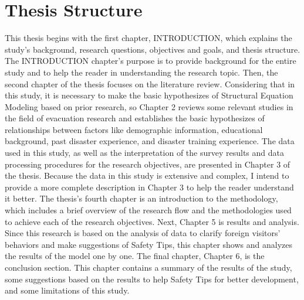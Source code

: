 \section{Thesis Structure}
This thesis begins with the first chapter, INTRODUCTION, which explains the study's background, research questions, objectives and goals, and thesis structure. The INTRODUCTION chapter's purpose is to provide background for the entire study and to help the reader in understanding the research topic. Then, the second chapter of the thesis focuses on the literature review. Considering that in this study, it is necessary to make the basic hypothesizes of Structural Equation Modeling based on prior research, so Chapter 2 reviews some relevant studies in the field of evacuation research and establishes the basic hypothesizes of relationships between factors like demographic information, educational background, past disaster experience, and disaster training experience. The data used in this study, as well as the interpretation of the survey results and data processing procedures for the research objectives, are presented in Chapter 3 of the thesis. Because the data in this study is extensive and complex, I intend to provide a more complete description in Chapter 3 to help the reader understand it better. The thesis's fourth chapter is an introduction to the methodology, which includes a brief overview of the research flow and the methodologies used to achieve each of the research objectives. Next, Chapter 5 is results and analysis. Since this research is based on the analysis of data to clarify foreign visitors' behaviors and make suggestions of Safety Tips, this chapter shows and analyzes the results of the model one by one. The final chapter, Chapter 6, is the conclusion section. This chapter contains a summary of the results of the study, some suggestions based on the results to help Safety Tips for better development, and some limitations of this study.

